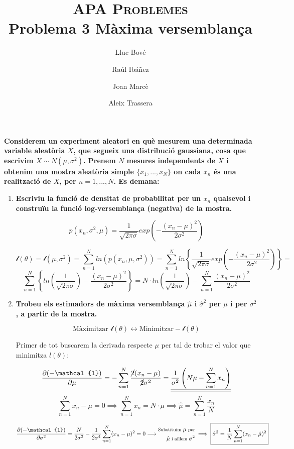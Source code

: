 \documentclass[a4paper]{article}
\title{\textsc{APA Problemes} \\ Problema 3 Màxima versemblança}
\author{Lluc Bové \and Raúl Ibáñez \and Joan Marcè \and Aleix Trassera}
\date{}
\begin{document}
\maketitle

\textbf{Considerem un experiment aleatori en què mesurem una determinada variable aleatòria $X$, que segueix una distribució gaussiana, cosa que escrivim $X \sim N(\mu, \sigma^2)$. Prenem $N$ mesures independents de $X$ i obtenim una mostra aleatòria simple $\{x_1, ..., x_N\}$ on cada $x_n$ és una realització de $X$, per $n=1,...,N$. Es demana:}

\begin{enumerate}
\item \textbf{Escriviu la funció de densitat de probabilitat per un $x_n$ qualsevol i construïu la funció log-versemblança (negativa) de la mostra.}

$$p(x_n, \sigma^2, \mu) = \frac{1}{\sqrt{2\pi\sigma}} exp\left(-\frac{(x_n - \mu)^2}{2\sigma^2}\right)$$

$$ 
\mathcal{l}(\theta) = \mathcal{l}(\mu,\sigma^2) = \sum_{n=1}^N ln(p(x_n, \mu, \sigma^2)) = 
\sum_{n=1}^N ln \left\{\frac{1}{\sqrt{2\pi\sigma}} exp\left(-\frac{(x_n - \mu)^2}{2\sigma^2}\right)\right\} =
$$
$$
\sum_{n=1}^N \left\{ ln \left(\frac{1}{\sqrt{2\pi\sigma}}\right) - \frac{(x_n - \mu)^2}{2\sigma^2} \right\} =
\boxed{N·ln \left(\frac{1}{\sqrt{2\pi\sigma}}\right) - \sum_{n=1}^N \frac{(x_n - \mu)^2}{2\sigma^2}}
$$

\item \textbf{Trobeu els estimadors de màxima versemblança $\hat{\mu}$ i $\hat{\sigma}^2$ per $\mu$ i per $\sigma^2$, a partir de la mostra.}

$$\text{Màximitzar } \mathcal{l}(\theta) \leftrightarrow \text{Minimitzar} -\mathcal{l}(\theta)$$

Primer de tot buscarem la derivada respecte $\mu$ per tal de trobar el valor que minimitza $l(\theta)$:

$$ 
\frac{\partial(-\mathcal{l})}{\partial\mu} = -\sum_{n=1}^N \frac{\cancel{2}(x_n - \mu)}{\cancel{2}\sigma^2} = 
\underline{\underline{\frac{1}{\sigma^2} \left(N\mu - \sum_{n=1}^N x_n \right)}}
$$
$$
\sum_{n=1}^N x_n - \mu = 0 \implies \sum_{n=1}^N x_n = N·\mu \implies 
\boxed{\hat{\mu} = \sum_{n=1}^N \frac{x_n}{N}}
$$ 

$$
\frac{\partial(-\mathcal{l})}{\partial\sigma^2} = \frac{N}{2\sigma^2} - \frac{1}{2\sigma^4}\sum_{n=1}^N (x_n - \mu)^2 = 0 \longrightarrow
\begin{aligned}
\footnotesize
\text{Substituïm } \mu \text{ per}\\
\footnotesize
\hat{\mu} \text{ i aïllem } \sigma^2 
\end{aligned} 
\implies \boxed{\hat{\sigma}^2 = \frac{1}{N} \sum_{n=1}^N (x_n - \hat{\mu})^2} 
$$


\end{enumerate}
\end{document}
